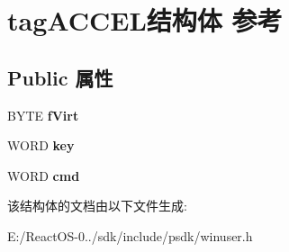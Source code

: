 \hypertarget{structtag_a_c_c_e_l}{}\section{tag\+A\+C\+C\+E\+L结构体 参考}
\label{structtag_a_c_c_e_l}
\subsection*{Public 属性}
\begin{DoxyCompactItemize}
\item 
\mbox{\label{structtag_a_c_c_e_l_ab0f4543342a212ca74bbe06f77606426}} 
B\+Y\+TE {\bfseries f\+Virt}
\item 
\mbox{\label{structtag_a_c_c_e_l_ad8b73cf5e11f6dea8c4a6256aa3a9f1f}} 
W\+O\+RD {\bfseries key}
\item 
\mbox{\label{structtag_a_c_c_e_l_a3f8bd6b20f984fe7b4ba83b1ae7fc3bf}} 
W\+O\+RD {\bfseries cmd}
\end{DoxyCompactItemize}


该结构体的文档由以下文件生成\+:\begin{DoxyCompactItemize}
\item 
E\+:/\+React\+O\+S-\/0../sdk/include/psdk/winuser.\+h\end{DoxyCompactItemize}
